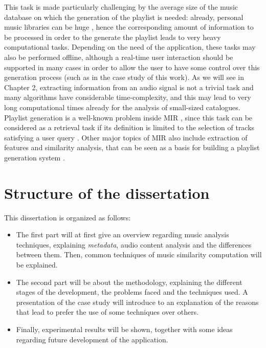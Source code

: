This task is made particularly challenging by the average size of the music database on which the generation of the playlist is needed: already, personal music libraries can be huge \cite{dias10}, hence the corresponding amount of information to be processed in order to the generate the playlist leads to very heavy computational tasks. Depending on the need of the application, these tasks may also be performed offline, although a real-time user interaction should be supported in many cases in order to allow the user to have some control over this generation process (such as in the case study of this work). As we will see in Chapter 2, extracting information from an audio signal is not a trivial task and many algorithms have considerable time-complexity, and this may lead to very long computational times already for the analysis of small-sized catalogues. Playlist generation is a well-known problem inside MIR \cite{downey03} \cite{grachten09}, since this task can be considered as a retrieval task if its definition is limited to the selection of tracks satisfying a user query \cite{bonnin14}. Other major topics of MIR also include extraction of features and similarity analysis, that can be seen as a basis for building a playlist generation system \cite{dopler08}. 

\section{Structure of the dissertation}
This dissertation is organized as follows:
\begin{itemize}
\item The first part will at first give an overview regarding music analysis techniques, explaining \textit{metadata}, audio content analysis and the differences between them. Then, common techniques of music similarity computation will be explained. 
\item The second part will be about the methodology, explaining the different stages of the development, the problems faced and the techniques used. A presentation of the case study will introduce to an explanation of the reasons that lead to prefer the use of some techniques over others.
\item Finally, experimental results will be shown, together with some ideas regarding future development of the application.
\end{itemize}

